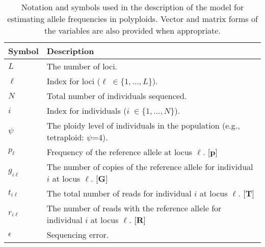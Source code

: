 \documentclass[11pt,english,letterpaper,oneside]{article}
\begin{document}
\begin{table}[b]
\centering
{}
\caption{Notation and symbols used in the description of the model for estimating allele frequencies in polyploids. Vector and matrix forms of the variables are also provided when appropriate.}
\vspace{0.2in}
\bgroup
\def\arraystretch{1.45}
\begin{tabular}[l]{l | l}
\hline
\textbf{Symbol} & \textbf{Description}\\ \hline
$L$ & The number of loci. \\
$\ell$ & Index for loci ($\ell\; \in \{1,\ldots,L\}$). \\
$N$ & Total number of individuals sequenced. \\
$i$ & Index for individuals ($i\; \in \{1,\ldots,N\}$). \\
$\psi$ & The ploidy level of individuals in the population (e.g., tetraploid: $\psi$=4). \\
$p_{\ell}$ & Frequency of the reference allele at locus $\ell$. [$\bm{p}$] \\
$g_{i \ell}$ & The number of copies of the reference allele for individual $i$ at locus $\ell$. [$\bm{G}$] \\
$t_{i \ell}$ & The total number of reads for individual $i$ at locus $\ell$. [$\bm{T}$] \\
$r_{i \ell}$ & The number of reads with the reference allele for individual $i$ at locus $\ell$. [$\bm{R}$] \\
$\epsilon$ & Sequencing error. \\
\hline
\end{tabular}
\egroup
\label{table1}
\end{table}


\end{document}
